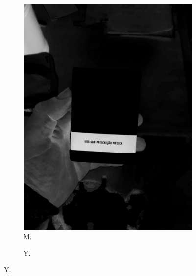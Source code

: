 \begin{figure}[htb]
\begin{subfigure}[t]{0.21\textwidth}
    \end{subfigure}
    \hfill
    \begin{subfigure}[t]{0.21\textwidth}
        \centering
        \caption{M.}
        \label{fig:foto:versoes:2:M}
        \includegraphics[width=\linewidth]{../pictures/tysabri_cmyk_m_only.jpg}
    \end{subfigure}
    \hfill
    \begin{subfigure}[t]{0.21\textwidth}
        \centering
        \caption{Y.}
        \label{fig:foto:versoes:2:Y}

\end{subfigure}
\end{figure}
